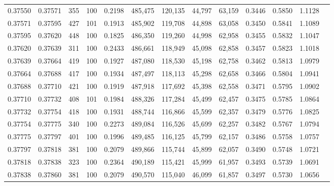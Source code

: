 \begin{tabular}{rrrrrrrrrrrrr}
0.37550 & 0.37571 &    355 & 100 &                                     0.2198 & 485,475 & 120,135 &  44,797 &  63,159 & 0.3446 & 0.5850 & 1.1128 \\
0.37571 & 0.37595 &    427 & 101 &                                     0.1913 & 485,902 & 119,708 &  44,898 &  63,058 & 0.3450 & 0.5841 & 1.1089 \\
0.37595 & 0.37620 &    448 & 100 &                                     0.1825 & 486,350 & 119,260 &  44,998 &  62,958 & 0.3455 & 0.5832 & 1.1047 \\
0.37620 & 0.37639 &    311 & 100 &                                     0.2433 & 486,661 & 118,949 &  45,098 &  62,858 & 0.3457 & 0.5823 & 1.1018 \\
0.37639 & 0.37664 &    419 & 100 &                                     0.1927 & 487,080 & 118,530 &  45,198 &  62,758 & 0.3462 & 0.5813 & 1.0979 \\
0.37664 & 0.37688 &    417 & 100 &                                     0.1934 & 487,497 & 118,113 &  45,298 &  62,658 & 0.3466 & 0.5804 & 1.0941 \\
0.37688 & 0.37710 &    421 & 100 &                                     0.1919 & 487,918 & 117,692 &  45,398 &  62,558 & 0.3471 & 0.5795 & 1.0902 \\
0.37710 & 0.37732 &    408 & 101 &                                     0.1984 & 488,326 & 117,284 &  45,499 &  62,457 & 0.3475 & 0.5785 & 1.0864 \\
0.37732 & 0.37754 &    418 & 100 &                                     0.1931 & 488,744 & 116,866 &  45,599 &  62,357 & 0.3479 & 0.5776 & 1.0825 \\
0.37754 & 0.37775 &    340 & 100 &                                     0.2273 & 489,084 & 116,526 &  45,699 &  62,257 & 0.3482 & 0.5767 & 1.0794 \\
0.37775 & 0.37797 &    401 & 100 &                                     0.1996 & 489,485 & 116,125 &  45,799 &  62,157 & 0.3486 & 0.5758 & 1.0757 \\
0.37797 & 0.37818 &    381 & 100 &                                     0.2079 & 489,866 & 115,744 &  45,899 &  62,057 & 0.3490 & 0.5748 & 1.0721 \\
0.37818 & 0.37838 &    323 & 100 &                                     0.2364 & 490,189 & 115,421 &  45,999 &  61,957 & 0.3493 & 0.5739 & 1.0691 \\
0.37838 & 0.37860 &    381 & 100 &                                     0.2079 & 490,570 & 115,040 &  46,099 &  61,857 & 0.3497 & 0.5730 & 1.0656 \\

\end{tabular}
